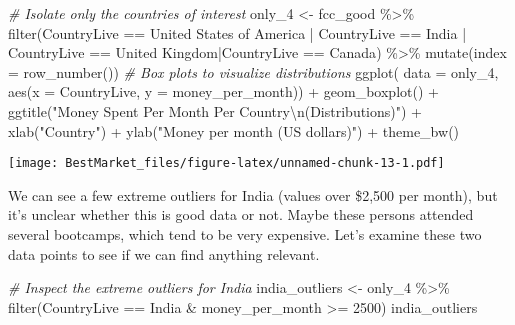 \documentclass[
]{article}
\newenvironment{Shaded}{\begin{snugshade}}{\end{snugshade}}
\newcommand{\AttributeTok}[1]{\textcolor[rgb]{0.77,0.63,0.00}{#1}}
\newcommand{\CommentTok}[1]{\textcolor[rgb]{0.56,0.35,0.01}{\textit{#1}}}
\newcommand{\DecValTok}[1]{\textcolor[rgb]{0.00,0.00,0.81}{#1}}
\newcommand{\FunctionTok}[1]{\textcolor[rgb]{0.00,0.00,0.00}{#1}}
\newcommand{\NormalTok}[1]{#1}
\newcommand{\OtherTok}[1]{\textcolor[rgb]{0.56,0.35,0.01}{#1}}
\newcommand{\SpecialCharTok}[1]{\textcolor[rgb]{0.00,0.00,0.00}{#1}}
\newcommand{\StringTok}[1]{\textcolor[rgb]{0.31,0.60,0.02}{#1}}
\begin{document}
\begin{Shaded}
\begin{Highlighting}[]
\CommentTok{\# Isolate only the countries of interest}
\NormalTok{only\_4  }\OtherTok{\textless{}{-}}\NormalTok{  fcc\_good }\SpecialCharTok{\%\textgreater{}\%} 
  \FunctionTok{filter}\NormalTok{(CountryLive }\SpecialCharTok{==} \StringTok{\textquotesingle{}United States of America\textquotesingle{}} \SpecialCharTok{|}\NormalTok{ CountryLive }\SpecialCharTok{==} \StringTok{\textquotesingle{}India\textquotesingle{}} \SpecialCharTok{|}\NormalTok{ CountryLive }\SpecialCharTok{==} \StringTok{\textquotesingle{}United Kingdom\textquotesingle{}}\SpecialCharTok{|}\NormalTok{CountryLive }\SpecialCharTok{==} \StringTok{\textquotesingle{}Canada\textquotesingle{}}\NormalTok{) }\SpecialCharTok{\%\textgreater{}\%}
  \FunctionTok{mutate}\NormalTok{(}\AttributeTok{index =} \FunctionTok{row\_number}\NormalTok{())}
\CommentTok{\# Box plots to visualize distributions}
\FunctionTok{ggplot}\NormalTok{( }\AttributeTok{data =}\NormalTok{ only\_4, }\FunctionTok{aes}\NormalTok{(}\AttributeTok{x =}\NormalTok{ CountryLive, }\AttributeTok{y =}\NormalTok{ money\_per\_month)) }\SpecialCharTok{+}
  \FunctionTok{geom\_boxplot}\NormalTok{() }\SpecialCharTok{+}
  \FunctionTok{ggtitle}\NormalTok{(}\StringTok{"Money Spent Per Month Per Country}\SpecialCharTok{\textbackslash{}n}\StringTok{(Distributions)"}\NormalTok{) }\SpecialCharTok{+}
  \FunctionTok{xlab}\NormalTok{(}\StringTok{"Country"}\NormalTok{) }\SpecialCharTok{+}
  \FunctionTok{ylab}\NormalTok{(}\StringTok{"Money per month (US dollars)"}\NormalTok{) }\SpecialCharTok{+}
  \FunctionTok{theme\_bw}\NormalTok{()}
\end{Highlighting}
\end{Shaded}

\texttt{[image: BestMarket\_files/figure-latex/unnamed-chunk-13-1.pdf]}

We can see a few extreme outliers for India (values over \$2,500 per
month), but it's unclear whether this is good data or not. Maybe these
persons attended several bootcamps, which tend to be very expensive.
Let's examine these two data points to see if we can find anything
relevant.

\begin{Shaded}
\begin{Highlighting}[]
\CommentTok{\# Inspect the extreme outliers for India}
\NormalTok{india\_outliers  }\OtherTok{\textless{}{-}}\NormalTok{  only\_4 }\SpecialCharTok{\%\textgreater{}\%}
  \FunctionTok{filter}\NormalTok{(CountryLive }\SpecialCharTok{==} \StringTok{\textquotesingle{}India\textquotesingle{}} \SpecialCharTok{\&} 
\NormalTok{           money\_per\_month }\SpecialCharTok{\textgreater{}=} \DecValTok{2500}\NormalTok{)}
\NormalTok{india\_outliers}
\end{Highlighting}
\end{Shaded}
\end{document}
